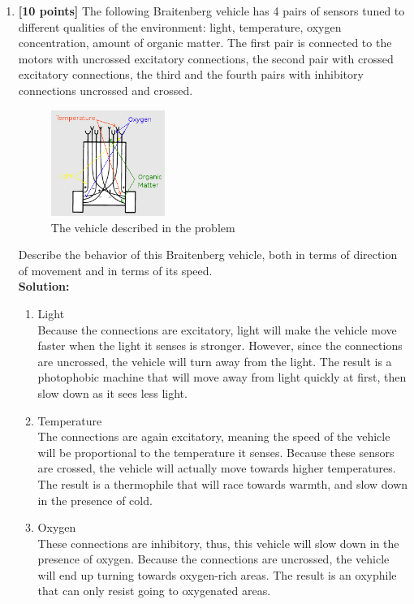 \documentclass{article}
\begin{document}
\begin{enumerate}
\item \textbf{[10 points]} The following Braitenberg vehicle has 4 pairs of sensors tuned to different qualities of the environment: light, temperature, oxygen concentration, amount of organic matter. The first pair is connected to the motors with uncrossed excitatory connections, the second pair with crossed excitatory connections, the third and the fourth pairs with inhibitory connections uncrossed and crossed. \\
    \begin{figure}[h!]
    \centering
    \includegraphics[width = 0.35\textwidth]{Braitenburg_vehicle}
    \caption{The vehicle described in the problem}
    \label{fig:Braitenburg_vehicle}
    \end{figure}
\newline
Describe the behavior of this Braitenberg vehicle, both in terms of direction of movement and in terms of its speed. \\ 

\textbf{Solution:} 
    \begin{enumerate}
    \item Light \\
    Because the connections are excitatory, light will make the vehicle move faster when the light it senses is stronger. However, since the connections are uncrossed, the vehicle will turn away from the light. The result is a photophobic machine that will move away from light quickly at first, then slow down as it sees less light.

    \item Temperature \\
    The connections are again excitatory, meaning the speed of the vehicle will be proportional to the temperature it senses. Because these sensors are crossed, the vehicle will actually move towards higher temperatures. The result is a thermophile that will race towards warmth, and slow down in the presence of cold.

    \item Oxygen \\
    These connections are inhibitory, thus, this vehicle will slow down in the presence of oxygen. Because the connections are uncrossed, the vehicle will end up turning towards oxygen-rich areas. The result is an oxyphile that can only resist going to oxygenated areas. 


\end{enumerate}
\end{enumerate}
\end{document}
